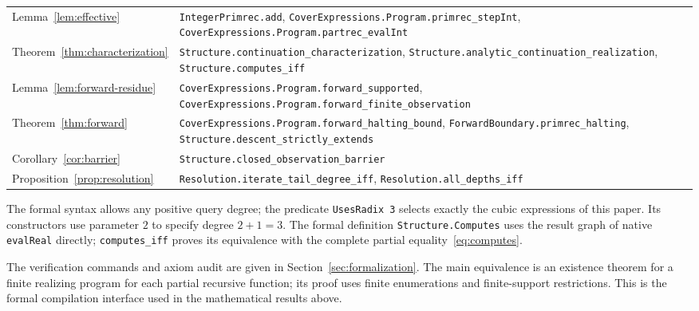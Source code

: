 \documentclass[11pt]{article}
\numberwithin{equation}{section}
\theoremstyle{definition}
\theoremstyle{remark}
\newcommand{\code}[1]{\nolinkurl{#1}}
\begin{document}
\begin{longtable}{@{}>{\raggedright\arraybackslash}p{}
  >{\raggedright\arraybackslash}p{}@{}}
Lemma~\ref{lem:effective} & \code{IntegerPrimrec.add},
 \code{CoverExpressions.Program.primrec_stepInt},
 \code{CoverExpressions.Program.partrec_evalInt}\\
Theorem~\ref{thm:characterization} &
 \code{Structure.continuation_characterization},
 \code{Structure.analytic_continuation_realization},
 \code{Structure.computes_iff}\\
Lemma~\ref{lem:forward-residue} &
 \code{CoverExpressions.Program.forward_supported},
 \code{CoverExpressions.Program.forward_finite_observation}\\
Theorem~\ref{thm:forward} &
 \code{CoverExpressions.Program.forward_halting_bound},
 \code{ForwardBoundary.primrec_halting},
 \code{Structure.descent_strictly_extends}\\
Corollary~\ref{cor:barrier} &
 \code{Structure.closed_observation_barrier}\\
Proposition~\ref{prop:resolution} &
 \code{Resolution.iterate_tail_degree_iff},
 \code{Resolution.all_depths_iff}\\
\end{longtable}
\endgroup

The formal syntax allows any positive query degree; the predicate
\code{UsesRadix 3} selects exactly the cubic expressions of this
paper. Its constructors use parameter $2$ to specify degree $2+1=3$.
The formal definition \code{Structure.Computes} uses the result graph
of native \code{evalReal} directly; \code{computes_iff} proves its
equivalence with the complete partial equality~\eqref{eq:computes}.

The verification commands and axiom audit are given in
Section~\ref{sec:formalization}.
The main equivalence is an existence theorem for a finite realizing
program for each partial recursive function; its proof uses finite
enumerations and finite-support restrictions. This is the formal
compilation interface used in the mathematical results above.

\begingroup
\raggedright


\endgroup
\end{document}
